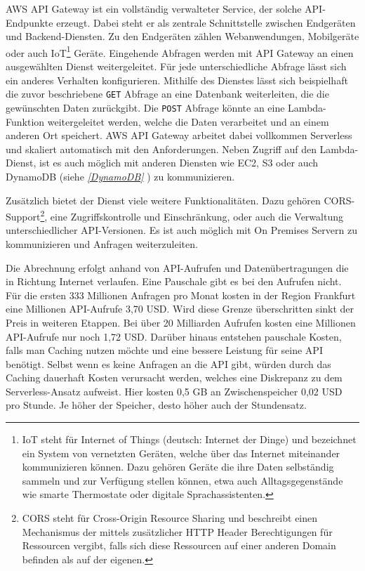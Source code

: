 AWS API Gateway ist ein vollständig verwalteter Service, der solche API-Endpunkte erzeugt.
Dabei steht er als zentrale Schnittstelle zwischen Endgeräten und Backend-Diensten.
Zu den Endgeräten zählen Webanwendungen, Mobilgeräte oder auch
IoT\footnote{IoT steht für Internet of Things (deutsch: Internet der Dinge) und bezeichnet ein System von vernetzten Geräten, welche
 über das Internet miteinander kommunizieren können. Dazu gehören Geräte die ihre Daten selbständig sammeln und zur Verfügung stellen können,
 etwa auch Alltagsgegenstände wie smarte Thermostate oder digitale Sprachassistenten. } Geräte.
Eingehende Abfragen werden mit API Gateway an einen ausgewählten Dienst weitergeleitet.
Für jede unterschiedliche Abfrage lässt sich ein anderes Verhalten konfigurieren.
Mithilfe des Dienstes lässt sich beispielhaft die zuvor beschriebene \verb+GET+ Abfrage an eine Datenbank weiterleiten, die die gewünschten Daten zurückgibt.
Die \verb+POST+ Abfrage könnte an eine Lambda-Funktion weitergeleitet werden, welche die Daten verarbeitet und an einem anderen Ort speichert.
AWS API Gateway arbeitet dabei vollkommen Serverless und skaliert automatisch mit den Anforderungen. Neben Zugriff auf den Lambda-Dienst, ist es auch möglich
mit anderen Diensten wie EC2, S3 oder auch DynamoDB (siehe \textit{\ref{DynamoDB} }) zu kommunizieren.

Zusätzlich bietet der Dienst viele weitere Funktionalitäten. Dazu gehören CORS-Support\footnote{CORS steht für Cross-Origin Resource Sharing und
beschreibt einen Mechanismus der mittels zusätzlicher HTTP Header Berechtigungen für Ressourcen vergibt, falls sich diese Ressourcen auf einer anderen
Domain befinden als auf der eigenen.}, eine Zugriffskontrolle und Einschränkung, oder auch die Verwaltung unterschiedlicher
API-Versionen. Es ist auch möglich mit On Premises Servern zu kommunizieren und Anfragen weiterzuleiten.\cite{APIGateway}

Die Abrechnung erfolgt anhand von API-Aufrufen und Datenübertragungen die in Richtung Internet verlaufen. Eine Pauschale gibt es bei den Aufrufen nicht.
Für die ersten 333 Millionen Anfragen pro Monat kosten in der Region Frankfurt eine Millionen API-Aufrufe 3,70 USD.
Wird diese Grenze überschritten sinkt der Preis in weiteren Etappen. Bei über 20 Milliarden Aufrufen kosten eine Millionen API-Aufrufe nur noch 1,72 USD.
Darüber hinaus entstehen pauschale Kosten, falls man Caching nutzen möchte und eine bessere Leistung für seine API benötigt.
Selbst wenn es keine Anfragen an die API gibt, würden durch das Caching dauerhaft Kosten verursacht werden, welches eine Diskrepanz zu dem Serverless-Ansatz aufweist.
Hier kosten 0,5 GB an Zwischenspeicher 0,02 USD pro Stunde. Je höher der Speicher, desto höher auch der Stundensatz.
\cite{APIGWPrice}
\clearpage
